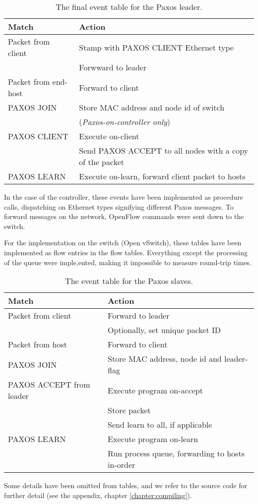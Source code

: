 \begin{table}[H]
  \centering
  \begin{tabular}{|l|l|}
    \hline \textbf{Match} & \textbf{Action} \\
    \hline Packet from client & Stamp with PAXOS CLIENT Ethernet type \\
                       & Forwward to leader \\
    \hline Packet from end-host & Forward to client \\
    \hline PAXOS JOIN  & Store MAC address and node id of switch \\
                       & (\textit{Paxos-on-controller only}) \\
    \hline PAXOS CLIENT & Execute on-client \\
                        & Send PAXOS ACCEPT to all nodes with a copy of the
                        packet \\
    \hline PAXOS LEARN & Execute on-learn, forward client packet to hosts  \\
    \hline
  \end{tabular}
  \caption{The final event table for the Paxos leader.}
  \label{table:complete.match.leader}
\end{table}

In the case of the controller, these events have been implemented as
procedure calls, dispatching on Ethernet types signifying different Paxos
messages.  To forward messages on the network, OpenFlow commands were sent
down to the switch.

For the implementation on the switch (Open vSwitch), these tables have been
implemented as flow entries in the flow tables.  Everything except the
processing of the queue were imple,ented, making it impossible to measure
round-trip times.

\begin{table}[H]
  \centering
  \begin{tabular}{|l|l|}
    \hline \textbf{Match} & \textbf{Action} \\
    \hline Packet from client & Forward to leader \\
                       & Optionally, set unique packet ID \\
    \hline Packet from host & Forward to client  \\
    \hline PAXOS JOIN & Store MAC address, node id and leader-flag \\
    \hline PAXOS ACCEPT from leader & Execute program on-accept \\
                                    & Store packet \\
                                    & Send learn to all, if applicable \\
    \hline PAXOS LEARN & Execute program on-learn \\
                       & Run process queue, forwarding to hosts in-order \\
    \hline
  \end{tabular}
  \caption{The event table for the Paxos slaves.}
  \label{table:complete.match.slave}
\end{table}

Some details have been omitted from tables, and we refer to the source code
for further detail (see the appendix, chapter \ref{chapter:compiling}).


